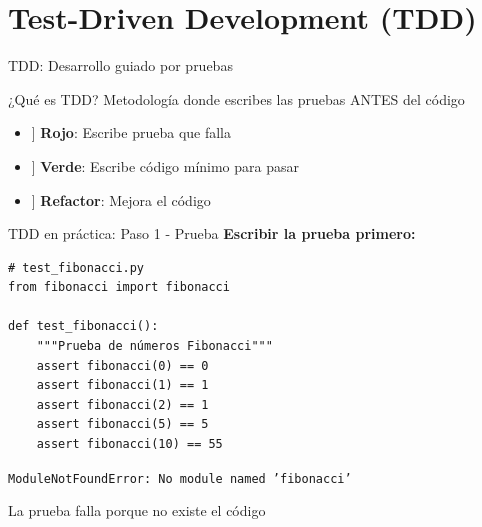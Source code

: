 \documentclass{beamer}
\begin{document}
\section{Test-Driven Development (TDD)}

\begin{frame}{TDD: Desarrollo guiado por pruebas \faRedo}
\begin{conceptbox}{¿Qué es TDD?}
Metodología donde escribes las pruebas ANTES del código
\end{conceptbox}

\vspace{0.2cm}
\begin{center}
\end{center}

\vspace{0.2cm}
\small
\begin{itemize}
    \item[\faCircle[red]] \textbf{Rojo}: Escribe prueba que falla
    \item[\faCircle[green]] \textbf{Verde}: Escribe código mínimo para pasar
    \item[\faCircle[blue]] \textbf{Refactor}: Mejora el código
\end{itemize}
\end{frame}

\begin{frame}[fragile]{TDD en práctica: Paso 1 - Prueba \faCircle[red]}
\textbf{Escribir la prueba primero:}
\begin{lstlisting}
# test_fibonacci.py
from fibonacci import fibonacci

def test_fibonacci():
    """Prueba de números Fibonacci"""
    assert fibonacci(0) == 0
    assert fibonacci(1) == 1
    assert fibonacci(2) == 1
    assert fibonacci(5) == 5
    assert fibonacci(10) == 55
\end{lstlisting}

\vspace{-0.2cm}
\begin{tcolorbox}[colback=red!10,colframe=red,title={\small\faExclamationTriangle \ Resultado},coltitle=fg0,left=3pt,right=3pt,top=2pt,bottom=2pt,boxsep=1pt]
\small\texttt{ModuleNotFoundError: No module named 'fibonacci'}
\end{tcolorbox}

\vspace{-0.1cm}
\begin{notebox}
\small\faCircle[red] La prueba falla porque no existe el código
\end{notebox}
\end{frame}
\end{document}
